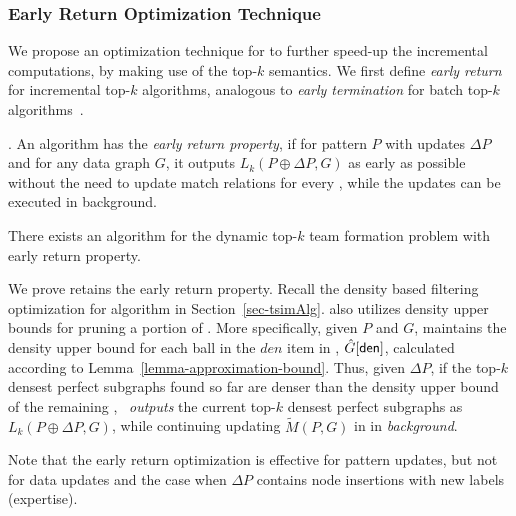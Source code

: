 \subsubsection{Early Return Optimization Technique}
\label{subsubsec-Inc-opt}


We propose an optimization technique for \incp to further speed-up the incremental computations, by making use of the top-$k$ semantics.
%
We first define {\em early return} for incremental top-$k$ algorithms, analogous to {\em early termination} for batch top-$k$ algorithms~\cite{FaginLotem03}.


. An algorithm has the {\em early return property},
if for pattern $P$ with updates $\Delta P$ and for any data graph $G$,
it outputs $L_k(P\oplus \Delta P, G)$ as early as possible without the need to update match relations for every \affballx,
while the updates can be executed in background.


\begin{prop}
\label{prop-early-return}
There exists an algorithm for the dynamic top-$k$ team formation problem with early return property.
\end{prop}


We prove \incp retains the early return property.
Recall the density based filtering optimization for algorithm \optgrouprec in Section~\ref{sec-tsimAlg}.
\incp also utilizes density upper bounds for pruning a portion of \affballsx.
More specifically, given $P$ and $G$, \incp maintains the density upper bound for each ball in the $den$ item in \bs, \ie $\hat{G}{}[{\mathsf{den}}]$,
calculated according to Lemma~\ref{lemma-approximation-bound}.
Thus, given $\Delta P$, if the top-$k$ densest perfect subgraphs found so far are denser than the density upper bound of the remaining \affballsx,
\incp\ {\em outputs} the current top-$k$ densest perfect subgraphs as $L_k(P\oplus \Delta P, G)$,
while continuing updating $\tilde{M}(P, G)$ in \affballsx in {\em background}.

Note that the early return optimization is  effective for pattern updates, but not for data updates and the case when $\Delta P$ contains node insertions with new labels (expertise).

